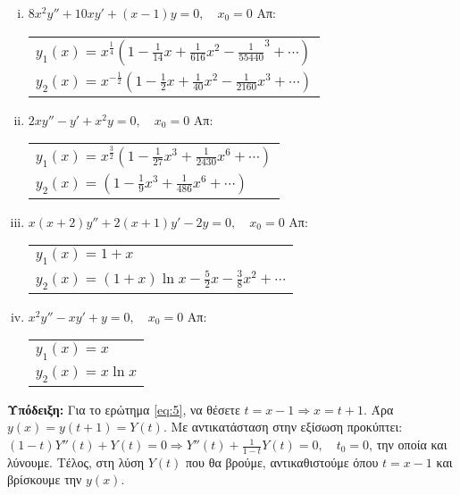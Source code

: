 \begin{enumerate}
    \begin{enumerate}[i)]
      \item $ 8x^{2}y'' + 10xy' + (x-1)y = 0, \quad x_{0} = 0 $ 
        \hfill Απ: \begin{tabular}{l} $ \scriptstyle{y_{1}(x) = x^{\frac{1}{4}}
            \left(1 - \frac{1}{14}x + \frac{1}{616}x^{2} - \frac{1}{55440}^{3} + 
          \cdots\right)}$ \\ 
          $ \scriptstyle{y_{2}(x) = x^{- \frac{1}{2}} \left(1 - \frac{1}{2} x + 
          \frac{1}{40} x^{2} - \frac{1}{2160} x^{3} + \cdots\right)} $	
        \end{tabular}   

      \item $ 2xy'' - y' +x^{2}y = 0, \quad x_{0} = 0$ 
        \hfill Απ: \begin{tabular}{l} $\scriptstyle{ y_{1}(x) = x^{\frac{3}{2}}
            \left(1 - \frac{1}{27}x^{3} + \frac{1}{2430}x^{6} + \cdots\right)}$  \\
          $\scriptstyle{ y_{2}(x) = \left(1 - \frac{1}{9} x^{3} + \frac{1}{486} x^{6} +
          \cdots\right)} $
        \end{tabular}

      \item $ x(x+2)y'' + 2(x+1)y' - 2y = 0, \quad x_{0} = 0$ 
        \hfill Απ: \begin{tabular}{l} $ \scriptstyle{ y_{1}(x) = 1 + x} $ \\
          $ \scriptstyle{ y_{2}(x) = (1+x) \ln{x} - \frac{5}{2} x - 
          \frac{3}{8} x^{2}} + \cdots $
        \end{tabular}  

      \item $ x^{2}y'' - xy' + y = 0, \quad x_{0} = 0 $ 
        \hfill Απ: \begin{tabular}{l} $\scriptstyle{ y_{1}(x) = x }$ \\
          $\scriptstyle{ y_{2}(x) = x \ln{x}} $
        \end{tabular} 
    \end{enumerate}
\end{enumerate}

\vspace{\baselineskip}


\textbf{Υπόδειξη:} 
Για το ερώτημα \ref{eq:5}, να θέσετε $ t = x - 1 \Rightarrow x = t+1 $. Άρα $ y(x) =
y(t+1) = Y(t) $. Με αντικατάσταση στην εξίσωση προκύπτει:
$ (1-t)Y''(t) + Y(t) = 0 \Rightarrow Y''(t) + \frac{1}{1-t} Y(t) = 0, \quad t_{0} = 0 $, την
οποία και λύνουμε. Τέλος, στη λύση $ Y(t) $ που θα βρούμε, αντικαθιστούμε όπου $t=x-1 $  και βρίσκουμε την  $ y(x) $.




